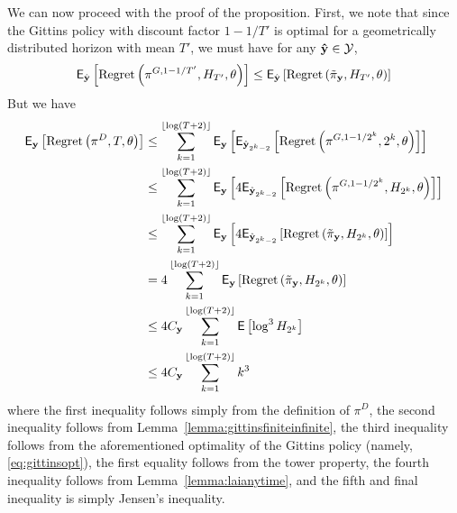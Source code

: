 {We can now proceed with the proof of the proposition. First, we note that since the Gittins policy with discount factor $1-1/{T'}$ is optimal for a geometrically distributed horizon with mean $T'$, we must have for any $\mathbf{\hat y} \in \mathcal Y$, 
\begin{equation}
\label{eq:gittinsopt}
\mathsf{E}_{\hat{\mathbf y}}\left[\textnormal{Regret} \left( \pi^{G, 1-1/{T'}}, H_{T'}, \theta \right)\right]
\leq
\mathsf{E}_{\hat{\mathbf y}}\left[\textnormal{Regret} \left( \tilde \pi_{\mathbf{y}}, H_{T'}, \theta \right)\right]
\end{equation}
But we have
\[
\begin{split}
\mathsf{E}_{{\mathbf y}}\left[\textnormal{Regret} \left( \pi^{D}, T, \theta \right)\right]
&\leq
\sum_{k=1}^{\lfloor \log (T+2) \rfloor}
\mathsf{E}_{{\mathbf y}}\left[
\mathsf{E}_{\hat{\mathbf y}_{2^k-2}}\left[
\textnormal{Regret} \left( \pi^{G,1-1/2^k}, 2^k, \theta \right)\right]
\right]
\\
&\leq
\sum_{k=1}^{\lfloor \log (T+2) \rfloor}
\mathsf{E}_{{\mathbf y}}\left[
4
\mathsf{E}_{\hat{\mathbf y}_{2^k-2}}\left[
\textnormal{Regret} \left( \pi^{G,1-1/2^k}, H_{2^k}, \theta \right)\right]
\right]
\\
&\leq
\sum_{k=1}^{\lfloor \log (T+2) \rfloor}
\mathsf{E}_{{\mathbf y}}\left[
4
\mathsf{E}_{\hat{\mathbf y}_{2^k-2}}\left[
\textnormal{Regret} \left( \tilde \pi_{\mathbf{y}}, H_{2^k}, \theta \right)
\right]
\right]
\\
&
=
4\sum_{k=1}^{\lfloor \log (T+2) \rfloor}
\mathsf{E}_{{\mathbf y}}\left[
\textnormal{Regret} \left( \tilde \pi_{\mathbf{y}}, H_{2^k}, \theta \right)
\right]
\\
&
\leq 
4 C_{\mathbf y}\sum_{k=1}^{\lfloor \log (T+2) \rfloor}
\mathsf{E} \left[ \log^3 H_{2^k} \right]
\\
&
\leq 
4 C_{\mathbf y}\sum_{k=1}^{\lfloor \log (T+2) \rfloor}
k^3
\end{split}
\]
where the first inequality follows simply from the definition of $\pi^D$, the second inequality follows from Lemma~\ref{lemma:gittinsfiniteinfinite}, the third inequality follows from the aforementioned optimality of the Gittins policy (namely, \eqref{eq:gittinsopt}), the first equality follows from the tower property, the fourth inequality follows from Lemma~\ref{lemma:laianytime}, and the fifth and final inequality is simply Jensen's inequality. 
}



